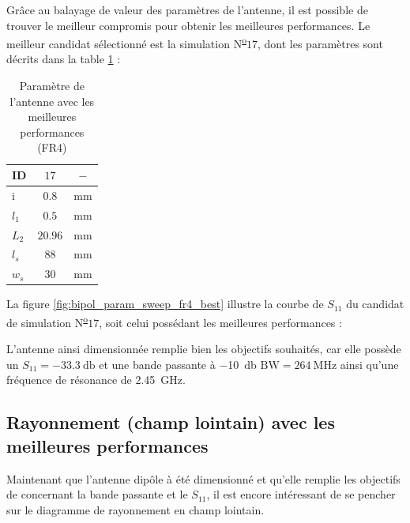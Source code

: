 \documentclass[Deriaz_Traiber_Labo02]{subfiles}
\begin{document}
Grâce au balayage de valeur des paramètres de l'antenne, il est possible de trouver le meilleur compromis pour obtenir les meilleures performances. Le meilleur candidat sélectionné est la simulation N\textsuperscript{\underline{o}}$17$, dont les paramètres sont décrits dans la table \ref{tab:best-perf-fr4} :

\begin{table}[H]
\centering
\begin{tabular}{||l c c||}    \hline
    ID      &    $17$     &  $-$ \\\hline
     i       &   $0.8$    &  \si{\milli\meter}\\
    $l_1$     &  $0.5$   &   \si{\milli\meter}\\
    $L_2$     & $20.96$  &  \si{\milli\meter}\\
    $l_s$      & $88$     &  \si{\milli\meter}\\
    $w_s$      & $30$     &  \si{\milli\meter}\\\hline
\end{tabular}
     \caption{Paramètre de l'antenne avec les meilleures performances (FR4)}
     \label{tab:best-perf-fr4}
\end{table}

\pagebreak

La figure \ref{fig:bipol_param_sweep_fr4_best} illustre la courbe de $S_{11}$ du candidat de simulation N\textsuperscript{\underline{o}}$17$, soit celui possédant les meilleures performances :


L'antenne ainsi dimensionnée remplie bien les objectifs souhaités, car elle possède un $S_{11} = \SI{-33.3}{\decibel}$ et une bande passante à \SI{-10}{\decibel} $\text{BW} = \SI{264}{\mega\hertz}$ ainsi qu'une fréquence de résonance de \SI{2.45}{\giga\hertz}.

\pagebreak

\subsection{Rayonnement (champ lointain) avec les meilleures performances}

Maintenant que l'antenne dipôle à été dimensionné et qu'elle remplie les objectifs de concernant la bande passante et le $S_{11}$, il est encore intéressant de se pencher sur le diagramme de rayonnement en champ lointain.\\
\end{document}
